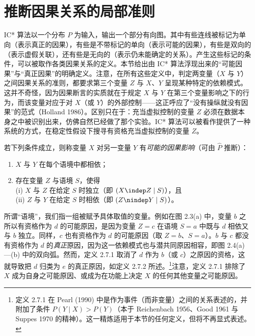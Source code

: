 \section{推断因果关系的局部准则}

IC* 算法以一个分布 $\hat{P}$ 为输入，输出一个部分有向图。其中有些连线被标记为单向（表示真正的因果），有些是不带标记的单向（表示可能的因果），有些是双向的（表示虚假关联），还有些是无向的（表示仍未能确定的关系）。产生这些标记的条件，可以被取作各类因果关系的定义。本节给出由 IC* 算法浮现出来的“可能因果”与“真正因果”的明确定义。注意，在所有这些定义中，判定两变量（$X$ 与 $Y$）之间因果关系的准则，都要求第三个变量 $Z$ 与 $X$、$Y$ 呈现某种特定的依赖模式。这并不奇怪，因为因果断言的实质就在于规定 $X$ 与 $Y$ 在第三个变量影响之下的行为，而该变量对应于对 $X$（或 $Y$）的外部控制——这正呼应了“没有操纵就没有因果”的范式（Holland 1986）。区别只在于：充当虚拟控制的变量 $Z$ 必须在数据本身之中被识别出来，仿佛自然已经做了那个实验。IC* 算法可以被看作提供了一种系统的方式，在稳定性假设下搜寻有资格充当虚拟控制的变量 $Z$。

\begin{definition}[可能原因]
若下列条件成立，则称变量 $X$ 对另一变量 $Y$ 有\emph{可能的因果影响}（可由 $\hat{P}$ 推断）：
\begin{enumerate}[label=\arabic*.,leftmargin=1.8em]
\item $X$ 与 $Y$ 在每个语境中都相依；
\item 存在变量 $Z$ 与语境 $S$，使得\\
(i) $X$ 与 $Z$ 在给定 $S$ 时独立（即 $(X\indep Z\mid S)$），且\\
(ii) $Z$ 与 $Y$ 在给定 $S$ 时相依（即 $(Z\nindep Y\mid S)$）。
\end{enumerate}
\end{definition}

所谓“语境”，我们指一组被赋予具体取值的变量。例如在图 2.3(a) 中，变量 $b$ 之所以有资格作为 $d$ 的可能原因，是因为变量 $Z=c$ 在语境 $S=a$ 中既与 $d$ 相依又与 $b$ 独立。同样，$c$ 也有资格作为 $d$ 的可能原因（取 $Z=b$、$S=a$）。$b$ 与 $c$ 都没有资格作为 $d$ 的\emph{真正}原因，因为这一依赖模式也与潜共同原因相容，即图 2.4(a)—(b) 中的双向弧。然而，定义 2.7.1 取消了 $d$ 作为 $b$（或 $c$）之原因的资格，这就导致把 $d$ 归类为 $e$ 的真正原因，如定义 2.7.2 所述。\footnote{定义 2.7.1 在 Pearl (1990) 中是作为事件（而非变量）之间的关系表述的，并附加了条件 $P(Y\mid X)>P(Y)$（本于 Reichenbach 1956、Good 1961 与 Suppes 1970 的精神）。这一精炼适用于本节的任何定义，但将不再显式表述。}注意，定义 2.7.1 排除了 $X$ 成为自身之可能原因、或成为在功能上决定 $X$ 的任何其他变量之可能原因。

